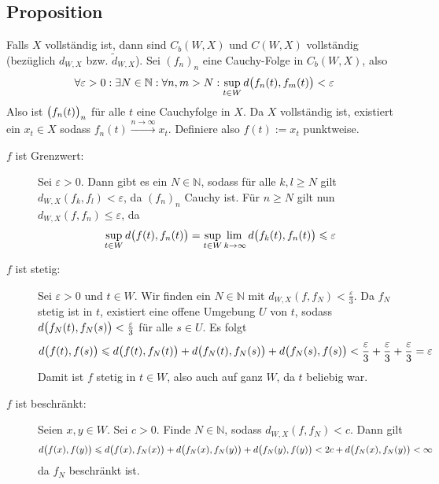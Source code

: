 \subsection[Proposition: Wenn $X$ vollständig ist, dann sind $C_b(W,X)$ und $C(W,X)$ vollständig]{Proposition} %
\label{sub:18}
Falls $X$ vollständig ist, dann sind $C_b(W,X)$ und $C(W,X)$ vollständig (bezüglich $d_{W,X}$ bzw. $\tilde{d}_{W,X}$).
Sei $(f_n)_n$ eine Cauchy-Folge in $C_b(W,X)$, also
\[
	\forall \varepsilon>0 : \exists N \in \mathds{N} : \forall n,m >N : \sup_{t \in W} d \enbrace[\big]{f_n(t), f_m(t)}< \varepsilon 
\]
Also ist $\enbrace[\big]{f_n(t)}_n$ für alle $t$ eine Cauchyfolge in $X$. Da $X$ vollständig ist, existiert ein $x_t \in X$ sodass 
$f_n(t) \xrightarrow{n \to \infty} x_t$. Definiere also $f(t) := x_t$ punktweise.
\begin{description}
	\item[$f$ ist Grenzwert:] Sei $\varepsilon>0$. Dann gibt es ein $N\in\mathds{N}$, sodass für alle $k,l\ge N$ gilt $d_{W,X}(f_k,f_l)<\varepsilon$, da $(f_n)_n$ Cauchy ist.
	Für $n \ge N$ gilt nun $d_{W,X}(f,f_n)\le\varepsilon$, da 
	\[
		\sup_{t\in W} d \enbrace[\big]{f(t),f_n(t)} = \adjustlimits \sup_{t\in W} \lim_{k \to \infty} d \enbrace[\big]{f_k(t),f_n(t)} \le \varepsilon
	\]
	\item[$f$ ist stetig:] Sei $\varepsilon>0$ und $t \in W$. Wir finden ein $N \in \mathds{N}$ mit $d_{W,X}(f,f_N)<\frac{\varepsilon}{3}$. Da $f_N$ stetig ist in $t$,
	existiert eine offene Umgebung $U$ von $t$, sodass $d \enbrace[\big]{f_N(t),f_N(s)}< \frac{\varepsilon}{3}$ für alle $s \in U$. Es folgt
	\[
		d \enbrace[\big]{f(t),f(s)} \le d \enbrace[\big]{f(t), f_N(t)} + d \enbrace[\big]{f_N(t),f_N(s)} + d \enbrace[\big]{f_N(s),f(s)} < 
		\frac{\varepsilon}{3}+\frac{\varepsilon}{3}+\frac{\varepsilon}{3} = \varepsilon     
	\]
	Damit ist $f$ stetig in $t \in W$, also auch auf ganz $W$, da $t$ beliebig war.
	\item[$f$ ist beschränkt:] Seien $x,y \in W$. Sei $c>0$. Finde $N \in \mathds{N}$, sodass $d_{W,X}(f,f_N) < c$. Dann gilt
	\[
		d \enbrace[\big]{f(x),f(y)} \le d \enbrace[\big]{f(x), f_N(x)} + d \enbrace[\big]{f_N(x),f_N(y)} + d \enbrace[\big]{f_N(y),f(y)} < 
		2c + d \enbrace[\big]{f_N(x),f_N(y)} < \infty
	\]
	da $f_N$ beschränkt ist. \bewende
\end{description}

